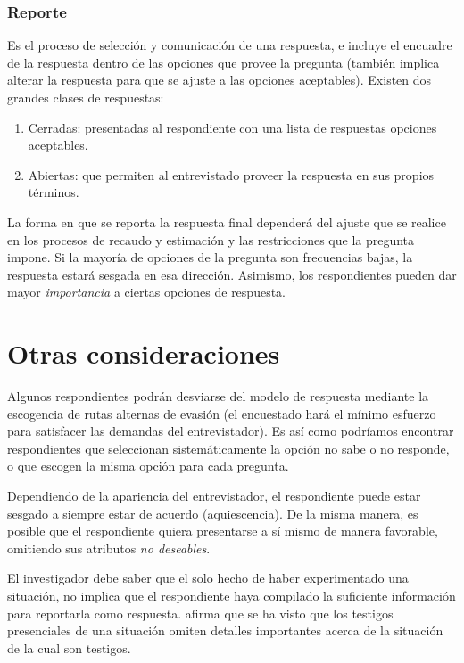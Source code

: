 \documentclass[
  10pt,
  spanish,
]{book}
\providecommand{\tightlist}{%
  \setlength{\itemsep}{0pt}\setlength{\parskip}{0pt}}
\begin{document}
\hypertarget{reporte}{%
\subsubsection*{Reporte}\label{reporte}}

Es el proceso de selección y comunicación de una respuesta, e incluye el encuadre de la respuesta dentro de las opciones que provee la pregunta (también implica alterar la respuesta para que se ajuste a las opciones aceptables). Existen dos grandes clases de respuestas:

\begin{enumerate}
\def\labelenumi{\arabic{enumi}.}
\tightlist
\item
  Cerradas: presentadas al respondiente con una lista de respuestas opciones aceptables.
\item
  Abiertas: que permiten al entrevistado proveer la respuesta en sus propios términos.
\end{enumerate}

La forma en que se reporta la respuesta final dependerá del ajuste que se realice en los procesos de recaudo y estimación y las restricciones que la pregunta impone. Si la mayoría de opciones de la pregunta son frecuencias bajas, la respuesta estará sesgada en esa dirección. Asimismo, los respondientes pueden dar mayor \emph{importancia} a ciertas opciones de respuesta.

\hypertarget{otras-consideraciones}{%
\section{Otras consideraciones}\label{otras-consideraciones}}

Algunos respondientes podrán desviarse del modelo de respuesta mediante la escogencia de rutas alternas de evasión (el encuestado hará el mínimo esfuerzo para satisfacer las demandas del entrevistador). Es así como podríamos encontrar respondientes que seleccionan sistemáticamente la opción no sabe o no responde, o que escogen la misma opción para cada pregunta.

Dependiendo de la apariencia del entrevistador, el respondiente puede estar sesgado a siempre estar de acuerdo (aquiescencia). De la misma manera, es posible que el respondiente quiera presentarse a sí mismo de manera favorable, omitiendo sus atributos \emph{no deseables}.

El investigador debe saber que el solo hecho de haber experimentado una situación, no implica que el respondiente haya compilado la suficiente información para reportarla como respuesta. \citet{Groves_Fowler_Couper_Lepkowski_Singer_Tourangeau_2009} afirma que se ha visto que los testigos presenciales de una situación omiten detalles importantes acerca de la situación de la cual son testigos.
\end{document}
